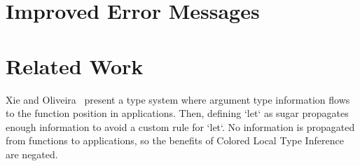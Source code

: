 \documentclass[9pt]{extarticle}
\begin{document}
\section{Improved Error Messages}

\section{Related Work}

Xie and Oliveira~\cite{xie2018let} present a type system where
argument type information flows to the function position in applications.
Then, defining `let` as sugar propagates enough information to avoid
a custom rule for `let`.
No information is propagated from functions to applications, so the benefits
of Colored Local Type Inference are negated.

%




\printbibliography
\end{document}
